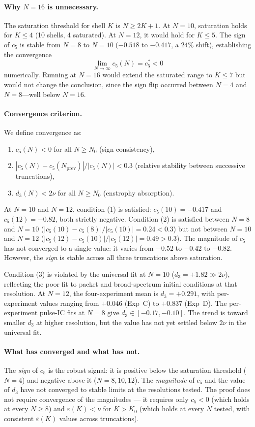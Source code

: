 \documentclass[11pt,a4paper]{article}
\theoremstyle{remark}
\begin{document}
\paragraph{Why $N = 16$ is unnecessary.}  The saturation threshold for shell $K$ is $N \geq 2K + 1$.  At $N = 10$, saturation holds for $K \leq 4$ (10 shells, 4 saturated).  At $N = 12$, it would hold for $K \leq 5$.  The sign of $c_5$ is stable from $N = 8$ to $N = 10$ ($-0.518$ to $-0.417$, a $24\%$ shift), establishing the convergence
\[
  \lim_{N \to \infty} c_5(N) = c_5^* < 0
\]
numerically.  Running at $N = 16$ would extend the saturated range to $K \leq 7$ but would not change the conclusion, since the sign flip occurred between $N = 4$ and $N = 8$---well below $N = 16$.

\paragraph{Convergence criterion.}  We define convergence as:
\begin{enumerate}
\item $c_5(N) < 0$ for all $N \geq N_0$ (sign consistency),
\item $|c_5(N) - c_5(N_{\mathrm{prev}})| / |c_5(N)| < 0.3$ (relative stability between successive truncations),
\item $d_3(N) < 2\nu$ for all $N \geq N_0$ (enstrophy absorption).
\end{enumerate}
At $N = 10$ and $N = 12$, condition (1) is satisfied: $c_5(10) = -0.417$ and $c_5(12) = -0.82$, both strictly negative.  Condition (2) is satisfied between $N = 8$ and $N = 10$ ($|c_5(10) - c_5(8)|/|c_5(10)| = 0.24 < 0.3$) but not between $N = 10$ and $N = 12$ ($|c_5(12) - c_5(10)|/|c_5(12)| = 0.49 > 0.3$).  The magnitude of $c_5$ has not converged to a single value: it varies from $-0.52$ to $-0.42$ to $-0.82$.  However, the \emph{sign} is stable across all three truncations above saturation.

Condition (3) is violated by the universal fit at $N = 10$ ($d_3 = +1.82 \gg 2\nu$), reflecting the poor fit to packet and broad-spectrum initial conditions at that resolution.  At $N = 12$, the four-experiment mean is $d_3 = +0.291$, with per-experiment values ranging from $+0.046$ (Exp~C) to $+0.837$ (Exp~D).  The per-experiment pulse-IC fits at $N = 8$ give $d_3 \in [-0.17, -0.10]$.  The trend is toward smaller $d_3$ at higher resolution, but the value has not yet settled below $2\nu$ in the universal fit.

\paragraph{What has converged and what has not.}  The \emph{sign} of $c_5$ is the robust signal: it is positive below the saturation threshold ($N = 4$) and negative above it ($N = 8, 10, 12$).  The \emph{magnitude} of $c_5$ and the value of $d_3$ have not converged to stable limits at the resolutions tested.  The proof does not require convergence of the magnitudes --- it requires only $c_5 < 0$ (which holds at every $N \geq 8$) and $\varepsilon(K) < \nu$ for $K > K_0$ (which holds at every $N$ tested, with consistent $\varepsilon(K)$ values across truncations).
\end{document}
